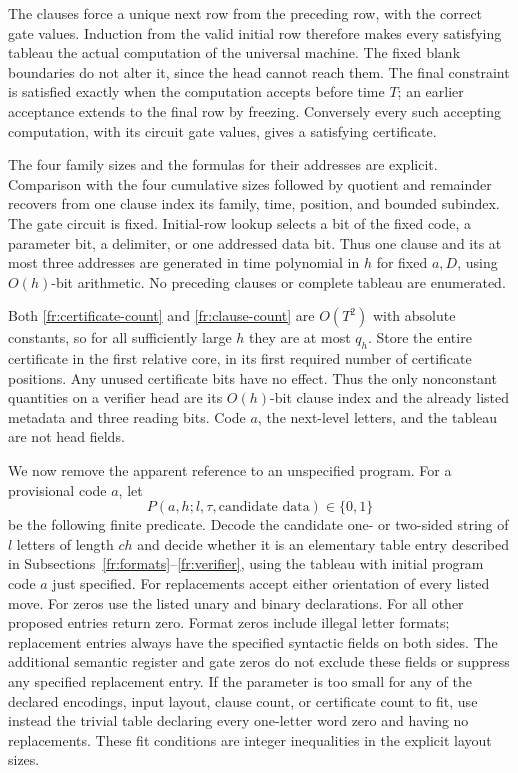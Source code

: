 The clauses force a unique next row from the preceding row, with
the correct gate values.  Induction from the valid initial row
therefore makes every satisfying tableau the actual computation
of the universal machine.  The fixed blank boundaries do not
alter it, since the head cannot reach them.  The final constraint
is satisfied exactly when the computation accepts before time
$T$; an earlier acceptance extends to the final row by freezing.
Conversely every such accepting computation, with its circuit
gate values, gives a satisfying certificate.

The four family sizes and the formulas for their addresses are
explicit.  Comparison with the four cumulative sizes followed
by quotient and remainder recovers from one clause index its
family, time, position, and bounded subindex.  The gate circuit
is fixed.  Initial-row lookup selects a bit of the fixed code, a
parameter bit, a delimiter, or one addressed data bit.  Thus one
clause and its at most three addresses are generated in time
polynomial in $h$ for fixed $a,D$, using $O(h)$-bit arithmetic.
No preceding clauses or complete tableau are enumerated.

Both \eqref{fr:certificate-count} and
\eqref{fr:clause-count} are $O(T^2)$ with absolute constants,
so for all sufficiently large $h$ they are at most $q_h$.
Store the entire certificate in the first relative core, in its
first required number of certificate positions.  Any unused
certificate bits have no effect.  Thus the only nonconstant
quantities on a verifier head are its $O(h)$-bit clause index and
the already listed metadata and three reading bits.  Code $a$, the
next-level letters, and the tableau are not head fields.

We now remove the apparent reference to an unspecified program.
For a provisional code $a$, let
\[
 P(a,h;l,\tau,\text{candidate data})\in\{0,1\}
\]
be the following finite predicate.  Decode the candidate one- or
two-sided string of $l$ letters of length $ch$ and decide whether
it is an elementary table entry described in
Subsections~\ref{fr:formats}--\ref{fr:verifier}, using the tableau
with initial program code $a$ just specified.  For replacements
accept either orientation of every listed move.  For zeros use
the listed unary and binary declarations.  For all other proposed
entries return zero.  Format zeros include illegal letter formats;
replacement entries always have the specified syntactic fields on
both sides.  The additional semantic register and gate zeros do not
exclude these fields or suppress any specified replacement entry.
If the parameter is too small for any of the declared
encodings, input layout, clause count, or certificate count to fit,
use instead the trivial table declaring every one-letter word
zero and having no replacements.  These fit conditions are
integer inequalities in the explicit layout sizes.

